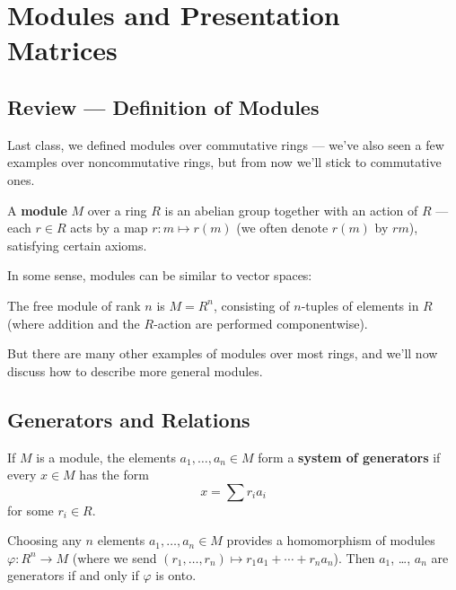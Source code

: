 

\section{Modules and Presentation Matrices}

\subsection{Review --- Definition of Modules}

Last class, we defined modules over commutative rings --- we've also seen a few examples over noncommutative rings, but from now we'll stick to commutative ones. 

\begin{definition}
A \textbf{module} $M$ over a ring $R$ is an abelian group together with an action of $R$ --- each $r \in R$ acts by a map $r : m \mapsto r(m)$ (we often denote $r(m)$ by $rm$), satisfying certain axioms. 
\end{definition}

In some sense, modules can be similar to vector spaces: 

\begin{example}
The free module of rank $n$ is $M = R^n$, consisting of $n$-tuples of elements in $R$ (where addition and the $R$-action are performed componentwise). 
\end{example}

But there are many other examples of modules over most rings, and we'll now discuss how to describe more general modules. 

\subsection{Generators and Relations}

If $M$ is a module, the elements $a_1, \ldots, a_n \in M$ form a \textbf{system of generators} if every $x \in M$ has the form \[x = \sum r_i a_i\] for some $r_i \in R.$ 

Choosing any $n$ elements $a_1, \ldots, a_n \in M$ provides a homomorphism of modules 
$\varphi : R^n \to M$ (where we send $(r_1, \ldots, r_n) \mapsto r_1a_1 + \cdots + r_na_n$). Then $a_1$, \ldots, $a_n$ are generators if and only if $\varphi$ is onto. 

